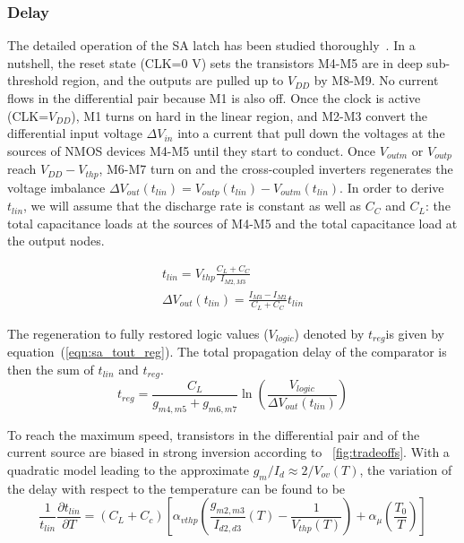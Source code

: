 \subsubsection{Delay}
The detailed operation of the SA latch has been studied thoroughly~\cite{Wicht2004, Razavi2015}.
In a nutshell, the reset state (CLK=0 V) sets the transistors M4-M5 are in deep sub-threshold region, and the outputs are pulled up to \(V_{DD}\) by M8-M9. No current flows in the differential pair because M1 is also off.
Once the clock is active (CLK=\(V_{DD}\)), M1 turns on hard in the linear region, and M2-M3 convert the differential input voltage \(\Delta V_{in}\) into a current that pull down the voltages at the sources of NMOS devices M4-M5 until they start to conduct.
Once \(V_{outm}\) or \(V_{outp}\) reach \(V_{DD}-V_{thp}\), M6-M7 turn on and the cross-coupled inverters regenerates the voltage imbalance \(\Delta V_{out}(t_{lin}) = V_{outp}(t_{lin}) - V_{outm}(t_{lin})\). In order to derive \(t_{lin}\), we will assume that the discharge rate is constant as well as \(C_{C}\) and \(C_{L}\): the total capacitance loads at the sources of M4-M5 and the total capacitance load at the output nodes.

\begin{eqnarray}
\label{eq:sa_tout_lin}
t_{lin} = V_{thp}\frac{{C_{L}+C_C}}{I_{M2,M3}}   \\
\Delta V_{out}(t_{lin}) = \frac{I_{M3}-I_{M2}}{{C_{L}+C_C}}t_{lin}  \label{eq:sa_dout_lin}
\end{eqnarray}

The regeneration to fully restored logic values (\(V_{logic}\)) denoted by \(t_{reg}\)is given by equation~(\ref{eqn:sa_tout_reg}). The total propagation delay of the comparator is then the sum of \(t_{lin}\) and \(t_{reg}\).
\begin{equation}
    \label{eqn:sa_tout_reg}
t_{reg} = \frac{C_{L}}{g_{m4,m5}+g_{m6,m7}} \ln{\left(\frac{V_{logic}}{\Delta V_{out}(t_{lin})}\right)}
\end{equation}

To reach the maximum speed, transistors in the differential pair and of the current source are biased in strong inversion according to \figurename~\ref{fig:tradeoffs}. With a quadratic model leading to the approximate \(g_m/I_d \approx 2/V_{ov}(T)\), the variation of the delay with respect to the temperature can be found to be 
\begin{equation}
\label{eqn:sa_dt_dT}
\frac{1}{t_{lin}}\frac{\partial t_{lin}}{\partial T} = (C_L+C_c) \left[ \alpha_{vthp} \left(\frac{g_{m2,m3}}{I_{d2,d3}}(T) - \frac{1}{V_{thp}(T)} \right) + \alpha_\mu \left(\frac{T_0}{T} \right) \right]
\end{equation}


